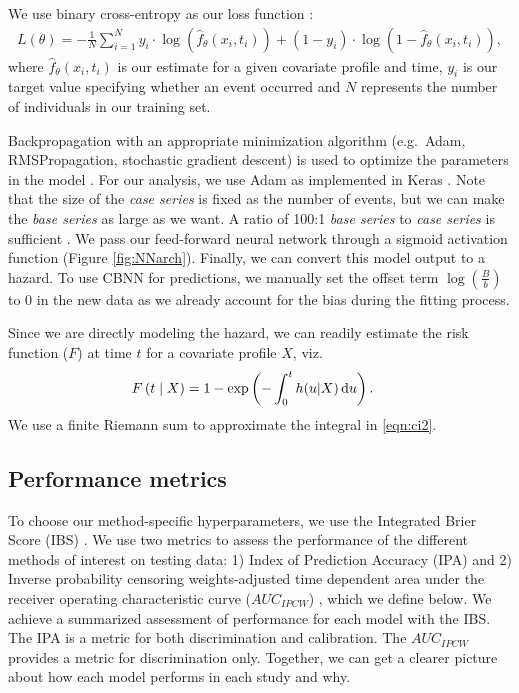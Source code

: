 \documentclass[APA,LATO1COL]{WileyNJD-v2}
\begin{document}
We use binary cross-entropy as our loss function \citep{gulli2017}:
\begin{align*}
L(\theta)=-\frac{1}{N} \sum^{N}_{i=1} y_{i} \cdot \log(\hat{f}_{\theta}(x_{i}, t_{i}) ) + (1-y_{i} )\cdot \log(1-\hat{f}_{\theta}(x_{i}, t_{i}) ),
\end{align*} where \(\hat{f}_{\theta}(x_{i}, t_{i})\) is our estimate
for a given covariate profile and time, \(y_{i}\) is our target value
specifying whether an event occurred and \(N\) represents the number of
individuals in our training set.

Backpropagation with an appropriate minimization algorithm (e.g.~Adam,
RMSPropagation, stochastic gradient descent) is used to optimize the
parameters in the model \citep{gulli2017}. For our analysis, we use Adam
as implemented in Keras \citep{gulli2017}. Note that the size of the
\emph{case series} is fixed as the number of events, but we can make the
\emph{base series} as large as we want. A ratio of 100:1 \emph{base
series} to \emph{case series} is sufficient \citep{hanley2009}. We pass
our feed-forward neural network through a sigmoid activation function
(Figure \ref{fig:NNarch}). Finally, we can convert this model output to
a hazard. To use CBNN for predictions, we manually set the
offset term \(\log\left(\frac{B}{b} \right)\) to 0 in the new data as we already account for the bias during the
fitting process.

Since we are directly modeling the hazard, we can readily estimate the
risk function (\(F\)) at time \(t\) for a covariate profile \(X\),
viz.\begin{align}\label{eqn:ci2}
F\left(t\mid X\right)& = 1 - \exp\left(-\int_{0}^{t}h(u|X) \,\textrm du\right).
\end{align} We use a finite Riemann sum \citep{hughes2020calculus} to
approximate the integral in \eqref{eqn:ci2}.



\hypertarget{performance-metrics}{%
\subsection{Performance metrics}\label{performance-metrics}}

To choose our method-specific hyperparameters, we use the Integrated
Brier Score (IBS) \citep{graf1999}. We use two metrics to assess the
performance of the different methods of interest on testing data: 1) Index of Prediction Accuracy (IPA)
\citep{kattan2018index} and 2) Inverse probability censoring weights-adjusted time dependent
area under the receiver operating characteristic curve ($AUC_{IPCW}$) \citep{auc}, which we 
define below. We achieve a summarized assessment of performance for each model with the
IBS. The IPA is a metric for both discrimination and calibration. The $AUC_{IPCW}$
provides a metric for discrimination only. Together, we can get a clearer picture about how
each model performs in each study and why.
\end{document}
